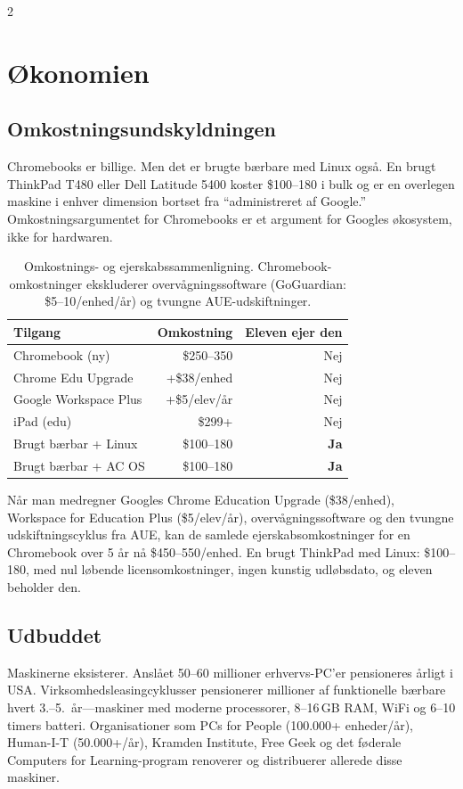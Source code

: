 \documentclass[11pt, a4paper]{article}
\begin{document}
\begin{multicols}{2}
\section{Økonomien}

\subsection{Omkostningsundskyldningen}

Chromebooks er billige. Men det er brugte bærbare med Linux også. En brugt ThinkPad T480 eller Dell Latitude 5400 koster \$100--180 i bulk og er en overlegen maskine i enhver dimension bortset fra ``administreret af Google.'' Omkostningsargumentet for Chromebooks er et argument for Googles økosystem, ikke for hardwaren.

\begin{table}[H]
\small
\centering
\begin{tabular}{lrr}
\toprule
\textbf{Tilgang} & \textbf{Omkostning} & \textbf{Eleven ejer den} \\
\midrule
Chromebook (ny) & \$250--350 & Nej \\
Chrome Edu Upgrade & +\$38/enhed & Nej \\
Google Workspace Plus & +\$5/elev/år & Nej \\
iPad (edu) & \$299+ & Nej \\
\midrule
Brugt bærbar + Linux & \$100--180 & \textbf{Ja} \\
Brugt bærbar + AC OS & \$100--180 & \textbf{Ja} \\
\bottomrule
\end{tabular}
\caption{Omkostnings- og ejerskabssammenligning. Chromebook-omkostninger ekskluderer overvågningssoftware (GoGuardian: \$5--10/enhed/år) og tvungne AUE-udskiftninger.}
\label{tab:cost}
\end{table}

Når man medregner Googles Chrome Education Upgrade (\$38/enhed), Workspace for Education Plus (\$5/elev/år), overvågningssoftware og den tvungne udskiftningscyklus fra AUE, kan de samlede ejerskabsomkostninger for en Chromebook over 5 år nå \$450--550/enhed. En brugt ThinkPad med Linux: \$100--180, med nul løbende licensomkostninger, ingen kunstig udløbsdato, og eleven beholder den.

\subsection{Udbuddet}

Maskinerne eksisterer. Anslået 50--60 millioner erhvervs-PC'er pensioneres årligt i USA. Virksomhedsleasingcyklusser pensionerer millioner af funktionelle bærbare hvert 3.--5.\ år---maskiner med moderne processorer, 8--16\,GB RAM, WiFi og 6--10 timers batteri. Organisationer som PCs for People (100.000+ enheder/år), Human-I-T (50.000+/år), Kramden Institute, Free Geek og det føderale Computers for Learning-program renoverer og distribuerer allerede disse maskiner.


\end{multicols}
\end{document}
